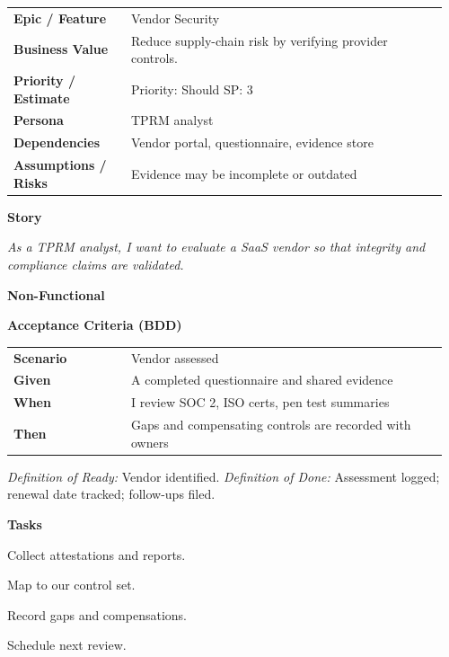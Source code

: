 \documentclass[11pt,letterpaper]{article}
\makeatletter
\newenvironment{kvtable}{%
  \par\noindent\begin{tabular}{@{}>{\raggedright\bfseries\arraybackslash}p{0.26\linewidth} >{\raggedright\arraybackslash}p{0.70\linewidth}@{}}
}{\end{tabular}\par}
\newenvironment{bdd}{%
  \par\noindent\begin{tabular}{@{}>{\raggedright\bfseries\arraybackslash}p{0.26\linewidth} >{\raggedright\arraybackslash}p{0.70\linewidth}@{}}
}{\end{tabular}\par}
\newcommand{\DoRDoD}[2]{%
  \vspace{0.35em}
  {\footnotesize\color{Muted}%
    \textit{Definition of Ready:} #1 \; \textbullet\;
    \textit{Definition of Done:} #2%
  }%
}
\newenvironment{storycard}[2]{%
  \begin{tcolorbox}[cloudcard, title={#1 --- #2}]%
}{\end{tcolorbox}}
\newcommand{\sectionlabel}[1]{\par\vspace{0.35em}\textbf{#1}\par}
\makeatother
\begin{document}
\begin{storycard}{CCS-18}{Ch. 18 — Third-Party Provider Integrity}
\begin{kvtable}
Epic / Feature & Vendor Security\\
Business Value & Reduce supply-chain risk by verifying provider controls.\\
Priority / Estimate & Priority: Should \quad SP: 3\\
Persona & TPRM analyst\\
Dependencies & Vendor portal, questionnaire, evidence store\\
Assumptions / Risks & Evidence may be incomplete or outdated\\
\end{kvtable}
\sectionlabel{Story}
\textit{As a TPRM analyst, I want to evaluate a SaaS vendor so that integrity and compliance claims are validated.}
\sectionlabel{Non-Functional}\;
\sectionlabel{Acceptance Criteria (BDD)}
\begin{bdd}
Scenario & Vendor assessed\\
Given & A completed questionnaire and shared evidence\\
When & I review SOC 2, ISO certs, pen test summaries\\
Then & Gaps and compensating controls are recorded with owners\\
\end{bdd}
\DoRDoD{Vendor identified.}{Assessment logged; renewal date tracked; follow-ups filed.}
\sectionlabel{Tasks}
\begin{checklist}
\item Collect attestations and reports.
\item Map to our control set.
\item Record gaps and compensations.
\item Schedule next review.
\end{checklist}
\end{storycard}
\end{document}
